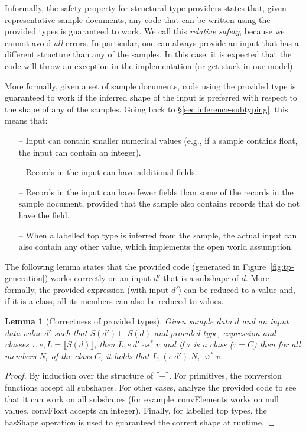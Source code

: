 \documentclass[10pt,nocopyrightspace]{sigplanconf}
\newcommand{\kvd}[1]{\textnormal{\textcolor{kvdclr}{\sffamily #1}}}
\newcommand{\ident}[1]{\textnormal{\sffamily #1}}
\newcommand{\reduce}{\rightsquigarrow}
\newcommand{\sem}[1]{\llbracket #1 \rrbracket}
\newcommand{\semalt}[1]{S(#1)}
\newtheorem{lemma}[theorem]{Lemma}
\begin{document}
Informally, the safety property for structural type providers states that, given representative sample
documents, any code that can be written using the provided types is guaranteed to work. We call this
\emph{relative safety}, because we cannot avoid \emph{all} errors. In particular, one can always
provide an input that has a different structure than any of the samples. In this case, it is expected
that the code will throw an exception in the implementation (or get stuck in our model).

More formally, given a set of sample documents, code using the provided type is guaranteed to work if
the inferred shape of the input is preferred with respect to the shape of any of the samples. Going back to
\S\ref{sec:inference-subtyping}, this means that:
\begin{itemize}
\item[--] Input can contain smaller numerical values (e.g., if a sample contains float, the input can contain an integer).
\item[--] Records in the input can have additional fields.
\item[--] Records in the input can have fewer fields than some of the records in the sample
  document, provided that the sample also contains records that do not have the field.
\item[--] When a labelled top type is inferred from the sample, the actual input can also contain any other value,
  which implements the open world assumption.
\end{itemize}
The following lemma states that the provided code (generated in Figure~\ref{fig:tp-generation})
works correctly on an input $d'$ that is a subshape of $d$. More formally, the provided
expression (with input $d'$) can be reduced to a value and, if it is a class,
all its members can also be reduced to values.

\begin{lemma}[Correctness of provided types]
\label{thm:tp-correctness}
Given sample data $d$ and an input data value $d'$ such that $\semalt{d'} \sqsubseteq \semalt{d}$
and provided type, expression and classes $\tau, e, L = \sem{\semalt{d}}$,
then $L, e~d' \reduce^{*} v$ and if $\tau$ is a class ($\tau=C$) then for all members $N_i$ of the
class $C$, it holds that $L, (e~d').N_i \reduce^{*} v$.
\end{lemma}
\begin{proof}
By induction over the structure of $\sem{-}$. For primitives, the conversion functions accept all subshapes.
For other cases, analyze the provided code to see that it can work on all subshapes (for example~\ident{convElements}
works on \kvd{null} values, \ident{convFloat} accepts an integer). Finally, for labelled top types,
the \ident{hasShape} operation is used to guaranteed the correct shape at runtime.
\end{proof}
\end{document}
